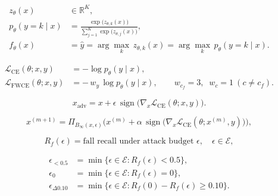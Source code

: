 \begin{align}
  z_\theta(x) &\in \mathbb{R}^{K}, \label{eq:logits}\\
  p_\theta(y=k\mid x) &= \frac{\exp\!\big(z_{\theta,k}(x)\big)}{\sum_{j=1}^{K}\exp\!\big(z_{\theta,j}(x)\big)}, \label{eq:softmax}\\
  f_\theta(x) &= \hat{y} = \arg\max_{k}\, z_{\theta,k}(x) = \arg\max_{k}\, p_\theta(y=k\mid x). \label{eq:argmax}
\end{align}

\begin{align}
  \mathcal{L}_{\mathrm{CE}}(\theta;x,y) &= -\log p_\theta(y\mid x), \label{eq:ce}\\
  \mathcal{L}_{\mathrm{FWCE}}(\theta;x,y) &= -\,w_y\,\log p_\theta(y\mid x),
     \qquad w_{c_f}=3,\;\; w_{c}=1\ (c\neq c_f). \label{eq:fwce}
\end{align}

\begin{equation}\label{eq:fgsm}
  x_{\mathrm{adv}} = x + \epsilon\,\operatorname{sign}\!\big(\nabla_x \mathcal{L}_{\mathrm{CE}}(\theta;x,y)\big).
\end{equation}

\begin{equation}\label{eq:pgd}
  x^{(m+1)} = \Pi_{B_\infty(x,\epsilon)}\!\Big(x^{(m)} + \alpha\,\operatorname{sign}\!\big(\nabla_x \mathcal{L}_{\mathrm{CE}}(\theta;x^{(m)},y)\big)\Big),
\end{equation}

\begin{equation}\label{eq:eps-sweep}
  R_f(\epsilon) = \text{fall recall under attack budget } \epsilon,
  \quad \epsilon \in \mathcal{E},
\end{equation}

\begin{align}
  \epsilon_{<0.5} &= \min\{\epsilon\in\mathcal{E} : R_f(\epsilon) < 0.5\}, \label{eq:collapse-half}\\
  \epsilon_{0}    &= \min\{\epsilon\in\mathcal{E} : R_f(\epsilon) = 0\}, \label{eq:collapse-zero}\\
  \epsilon_{\Delta 0.10} &= \min\{\epsilon\in\mathcal{E} : R_f(0)-R_f(\epsilon)\ge 0.10\}. \label{eq:collapse-drop}
\end{align}


